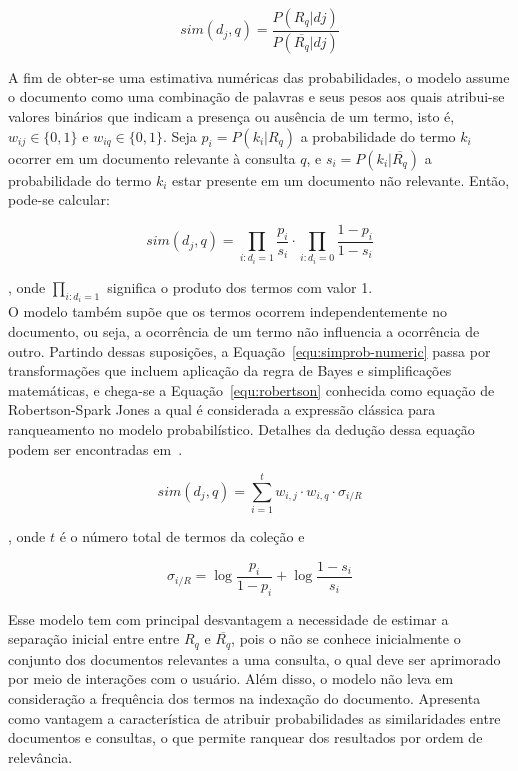 \begin{equation}
	sim(d_j, q) = \frac{P(R_q|dj)}{P(\overline{R_q}|dj)} 
	\label{equ:simprob}
\end{equation}


A fim de obter-se uma estimativa numéricas das probabilidades, o modelo assume o documento como uma combinação de palavras e seus pesos aos quais atribui-se valores binários que indicam a presença ou ausência de um termo, isto é, $w_{ij} \in \{0,1\}$ e $w_{iq} \in \{0,1\}$. Seja $p_i = P(k_i|R_q)$ a probabilidade do termo $k_i$ ocorrer em um documento relevante à consulta $q$, e $s_i    = P(k_i|\overline{R_q})$ a probabilidade do termo $k_i$ estar presente em um documento não relevante. Então, pode-se calcular:

\begin{equation}
	sim(d_j, q) = 	
	\prod_{i:d_i=1} \frac{p_i}{s_i} 
	\cdot
	\prod_{i:d_i=0} \frac{1 - p_i}{1 - s_i}
	\label{equ:simprob-numeric}
\end{equation}

, onde $\prod_{i:d_i=1}$ significa o produto dos termos com valor 1.\\


%
%
O modelo também supõe que os termos ocorrem independentemente no documento, ou seja, a ocorrência de um termo não influencia a ocorrência de outro. 
Partindo dessas suposições, a Equação~\ref{equ:simprob-numeric} passa por transformações que incluem aplicação da regra de Bayes e simplificações matemáticas, e chega-se a Equação~\ref{equ:robertson} conhecida como equação de Robertson-Spark Jones a qual é considerada a expressão clássica para ranqueamento no modelo probabilístico. Detalhes da dedução dessa equação podem ser encontradas em~\cite{Croft2009, Manning2008, Rijsbergen1979}.



\begin{equation}
	sim(d_j,q) = \sum_{i=1}^{t} w_{i,j} \cdot w_{i,q}  \cdot \sigma_{i/R}
	\label{equ:robertson}
\end{equation}


, onde $t$ é o número total de termos da coleção e 

\begin{equation}
	\sigma_{i/R} = \log \frac{p_i}{1-p_i} + \log \frac{1-s_i}{s_i}
\end{equation}


Esse modelo tem com principal desvantagem a necessidade de estimar a separação inicial entre entre $R_q$ e $\overline{R_q}$, pois o não se conhece inicialmente o conjunto dos documentos relevantes a uma consulta, o qual deve ser aprimorado por meio de interações com o usuário. Além disso, o modelo não leva em consideração a frequência dos termos na indexação do documento. Apresenta como vantagem a característica de atribuir probabilidades as similaridades entre documentos e consultas, o que permite ranquear dos resultados por ordem de relevância. 












